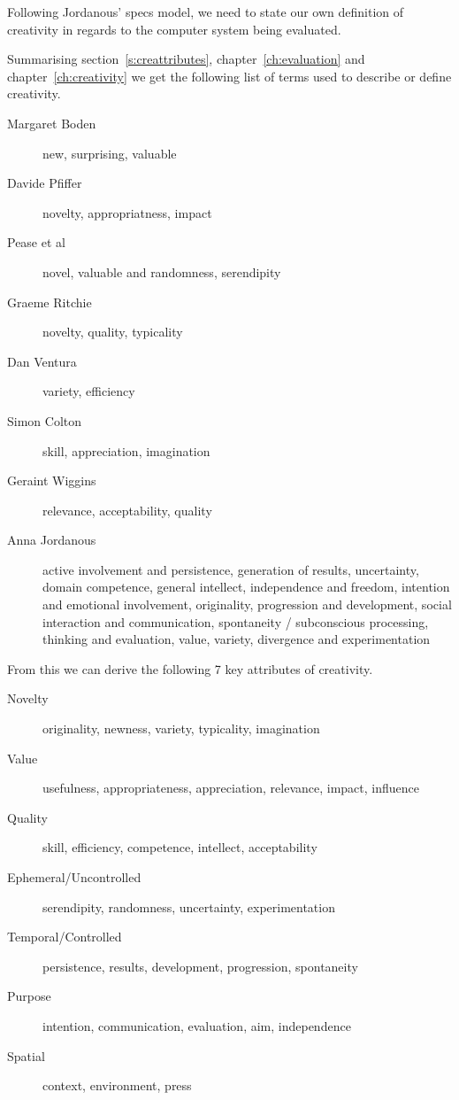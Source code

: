 Following Jordanous' \gls{specs} model, we need to state our own definition of creativity in regards to the computer system being evaluated.

Summarising section~\ref{s:creattributes}, chapter~\ref{ch:evaluation} and chapter~\ref{ch:creativity} we get the following list of terms used to describe or define creativity.

\begin{description}
  \item [Margaret Boden] new, surprising, valuable \autocite{Boden2003}
  \item [Davide Pfiffer] novelty, appropriatness, impact \autocite{Piffer2012}
  \item [Pease et al] novel, valuable \autocite{Pease2001} and randomness, serendipity \autocite{Pease2013}
  \item [Graeme Ritchie] novelty, quality, typicality \autocite{Ritchie2007}
  \item [Dan Ventura] variety, efficiency \autocite{Ventura2008}
  \item [Simon Colton] skill, appreciation, imagination \autocite{Colton2008a, Colton2008}
  \item [Geraint Wiggins] relevance, acceptability, quality \autocite{Wiggins2006}
  \item [Anna Jordanous] active involvement and persistence, generation of results, uncertainty, domain competence, general intellect, independence and freedom, intention and emotional involvement, originality, progression and development, social interaction and communication, spontaneity / subconscious processing, thinking and evaluation, value, variety, divergence and experimentation \autocite{Jordanous2012}
\end{description}

From this we can derive the following 7 key attributes of creativity.

\begin{description}
  \item [Novelty] originality, newness, variety, typicality, imagination
  \item [Value] usefulness, appropriateness, appreciation, relevance, impact, influence
  \item [Quality] skill, efficiency, competence, intellect, acceptability
  \item [Ephemeral/Uncontrolled] serendipity, randomness, uncertainty, experimentation
  \item [Temporal/Controlled] persistence, results, development, progression, spontaneity
  \item [Purpose] intention, communication, evaluation, aim, independence
  \item [Spatial] context, environment, press
\end{description}





